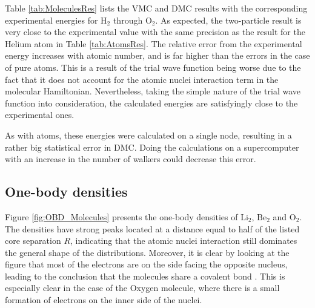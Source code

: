 Table \ref{tab:MoleculesRes} lists the VMC and DMC results with the corresponding experimental energies for $\mathrm{H_2}$ through $\mathrm{O_2}$. As expected, the two-particle result is very close to the experimental value with the same precision as the result for the Helium atom in Table \ref{tab:AtomsRes}. The relative error from the experimental energy increases with atomic number, and is far higher than the errors in the case of pure atoms. This is a result of the trial wave function being worse due to the fact that it does not account for the atomic nuclei interaction term in the molecular Hamiltonian. Nevertheless, taking the simple nature of the trial wave function into consideration, the calculated energies are satisfyingly close to the experimental ones. 

As with atoms, these energies were calculated on a single node, resulting in a rather big statistical error in DMC. Doing the calculations on a supercomputer with an increase in the number of walkers could decrease this error.

\subsection{One-body densities}

Figure \ref{fig:OBD_Molecules} presents the one-body densities of $\mathrm{Li_2}$, $\mathrm{Be_2}$ and $\mathrm{O_2}$. The densities have strong peaks located at a distance equal to half of the listed core separation $R$, indicating that the atomic nuclei interaction still dominates the general shape of the distributions. Moreover, it is clear by looking at the figure that most of the electrons are on the side facing the opposite nucleus, leading to the conclusion that the molecules share a covalent bond \cite{UniversityPhysics}. This is especially clear in the case of the Oxygen molecule, where there is a small formation of electrons on the inner side of the nuclei.

